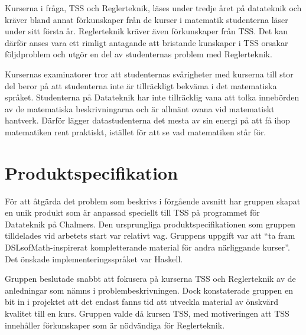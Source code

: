 \documentclass[]{article}
\begin{document}
Kurserna i fråga, TSS och Reglerteknik, läses under tredje året på
datateknik och kräver bland annat förkunskaper från de kurser i matematik
studenterna läser under sitt första år. Reglerteknik kräver även förkunskaper
från TSS. Det kan därför anses vara ett rimligt antagande att bristande
kunskaper i TSS orsakar följdproblem och utgör en del av studenternas
problem med Reglerteknik.

Kursernas examinatorer tror att studenternas svårigheter med kurserna till
stor del beror på att studenterna inte är tillräckligt bekväma
i det matematiska språket. Studenterna på Datateknik har inte tillräcklig
vana att tolka innebörden av de matematiska beskrivningarna och är allmänt
ovana vid matematiskt hantverk. Därför lägger datastudenterna det mesta av
sin energi på att få ihop matematiken rent praktiskt,
istället för att se vad matematiken står för.

\section{Produktspecifikation}


För att åtgärda det problem som beskrivs i förgående avsnitt har gruppen skapat
en unik produkt som är anpassad speciellt till TSS på programmet för Datateknik
på Chalmers. Den ursprungliga produktspecifikationen som gruppen tilldelades vid
arbetets start var relativt vag. Gruppens uppgift var att ``ta fram
DSLsofMath-inspirerat kompletterande material för andra närliggande kurser''.
Det önskade implementeringsspråket var Haskell.

Gruppen beslutade snabbt att fokusera på kurserna TSS och Reglerteknik av de
anledningar som nämns i problembeskrivningen. Dock konstaterade gruppen en bit
in i projektet att det endast fanns tid att utveckla material av önskvärd
kvalitet till en kurs. Gruppen valde då kursen TSS, med motiveringen att
TSS innehåller förkunskaper som är nödvändiga för Reglerteknik.
\end{document}
